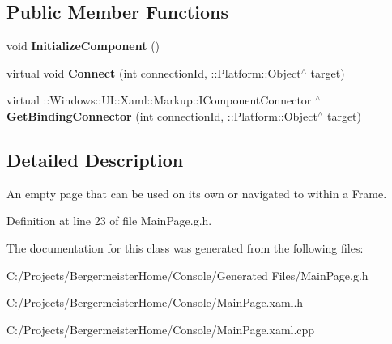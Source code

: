 \subsection*{Public Member Functions}
\begin{DoxyCompactItemize}
\item 
\mbox{\label{class_console_1_1_main_page_a6bb795510044a28234a66b9a6c957c52}} 
void {\bfseries Initialize\+Component} ()
\item 
\mbox{\label{class_console_1_1_main_page_a6f1a1833bf7cd5055b249114d066cc5f}} 
virtual void {\bfseries Connect} (int connection\+Id, \+::Platform\+::\+Object$^\wedge$ target)
\item 
\mbox{\label{class_console_1_1_main_page_af11786f4a1d1244e44ca0c505873d32a}} 
virtual \+::Windows\+::\+U\+I\+::\+Xaml\+::\+Markup\+::\+I\+Component\+Connector $^\wedge$ {\bfseries Get\+Binding\+Connector} (int connection\+Id, \+::Platform\+::\+Object$^\wedge$ target)
\end{DoxyCompactItemize}


\subsection{Detailed Description}
An empty page that can be used on its own or navigated to within a Frame. 



Definition at line 23 of file Main\+Page.\+g.\+h.



The documentation for this class was generated from the following files\+:\begin{DoxyCompactItemize}
\item 
C\+:/\+Projects/\+Bergermeister\+Home/\+Console/\+Generated Files/Main\+Page.\+g.\+h\item 
C\+:/\+Projects/\+Bergermeister\+Home/\+Console/Main\+Page.\+xaml.\+h\item 
C\+:/\+Projects/\+Bergermeister\+Home/\+Console/Main\+Page.\+xaml.\+cpp\end{DoxyCompactItemize}
